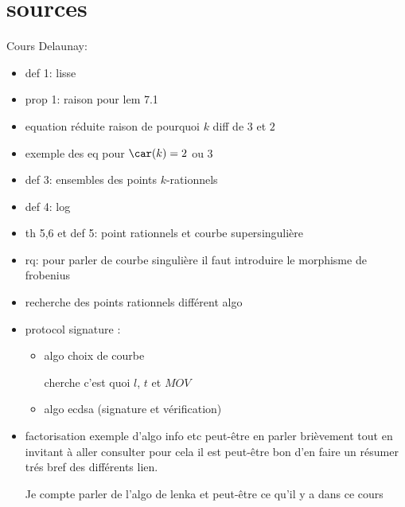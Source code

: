 \section{sources}

Cours Delaunay: 
\begin{itemize}
    \item def 1: lisse
    \item prop 1: raison pour lem 7.1
    \item equation réduite raison de pourquoi $k$ diff de $3$ et $2$
    \item exemple des eq pour  $\car(k)=2$ ou $3$
    \item def 3: ensembles des points $k$-rationnels
    \item def 4: log
    \item th 5,6 et def 5: point rationnels et courbe supersingulière
    \item rq: pour parler de courbe singulière il faut introduire le morphisme de frobenius
    \item recherche des points rationnels différent algo
    \item protocol signature :
        \begin{itemize}
            \item algo choix de courbe

                cherche c'est quoi $l$, $t$ et $MOV$
            \item algo ecdsa (signature et vérification)
        \end{itemize}
    \item factorisation exemple d'algo info etc peut-être en parler brièvement tout en invitant
        à aller consulter pour cela il est peut-être bon d'en faire un résumer trés bref des
        différents lien.

        Je compte parler de l'algo de lenka et peut-être ce qu'il y a dans ce cours
\end{itemize}

